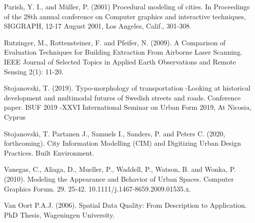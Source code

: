 \documentclass{kththesis}
\begin{document}
\begin{thebibliography}{9}
Parish, Y. I., and Müller, P. (2001) Procedural modeling of cities. In Proceedings of the 28th annual conference on Computer graphics and interactive techniques, SIGGRAPH, 12-17 August 2001, Los Angeles, Calif., 301-308.

Rutzinger, M., Rottensteiner, F. and Pfeifer, N. (2009). A Comparison of Evaluation Techniques for Building Extraction From Airborne Laser Scanning. IEEE Journal of Selected Topics in Applied Earth Observations and Remote Sensing 2(1): 11-20.

Stojanovski, T. (2019). Typo-morphology of transportation -Looking at historical development and multimodal futures of Swedish streets and roads. Conference paper. ISUF 2019 -XXVI International Seminar on Urban Form 2019, At Nicosia, Cyprus

Stojanovski, T. Partanen J., Samuels I., Sanders, P. and Peters C. (2020, forthcoming). City Information Modelling (CIM) and Digitizing Urban Design Practices. Built Environment.

Vanegas, C., Aliaga, D., Mueller, P., Waddell, P., Watson, B. and Wonka, P. (2010). Modeling the Appearance and Behavior of Urban Spaces. Computer Graphics Forum. 29. 25-42. 10.1111/j.1467-8659.2009.01535.x. 

Van Oort P.A.J. (2006). Spatial Data Quality: From Description to Application. PhD Thesis, Wageningen University.

\end{thebibliography}

\appendix

\tailmatter
\end{document}
